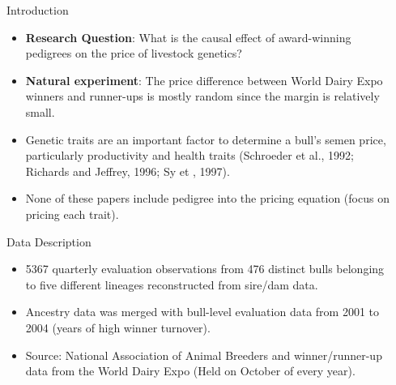 \documentclass[final]{beamer}
\newlength{\sepwid}
\newlength{\onecolwid}
\begin{document}
\begin{frame}[t] %
\begin{columns}[t] %

\begin{column}{\sepwid}\end{column} %

\begin{column}{\onecolwid} %


\begin{block}{Introduction}
\begin{center}
\end{center}
\begin{itemize}
\item \textbf{Research Question}: What is the causal effect of award-winning pedigrees on the price of livestock genetics?
\item \textbf{Natural experiment}: The price difference between World Dairy Expo winners and runner-ups is mostly random since the margin is relatively small.
\item Genetic traits are an important factor to determine a bull's semen price, particularly productivity and health traits (Schroeder et al., 1992; Richards and Jeffrey, 1996; Sy et , 1997).
\item None of these papers include pedigree into the pricing equation (focus on pricing each trait).
\end{itemize}

\end{block}
\begin{block}{Data Description}
\begin{itemize}
\item 5367 quarterly evaluation observations from 476 distinct bulls belonging to five different lineages reconstructed from sire/dam data.
\item Ancestry data was merged with bull-level evaluation data from 2001 to 2004 (years of high winner turnover).
\item Source: National Association of Animal Breeders and winner/runner-up data from the World Dairy Expo (Held on October of every year).
\end{itemize}
\end{block}


\end{column}
\end{columns}
\end{frame}
\end{document}
